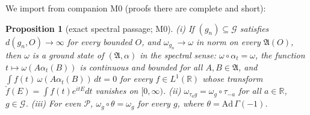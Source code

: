 \documentclass[11pt,a4paper]{article}
\theoremstyle{plain}
\newtheorem{proposition}[theorem]{Proposition}
\theoremstyle{definition}
\newcommand{\R}{\mathbb{R}}
\newcommand{\A}{\mathfrak{A}}
\newcommand{\G}{\mathcal{G}}
\begin{document}
We import from companion M0 (proofs there are complete and short):

\begin{proposition}[exact spectral passage; M0]\label{prop:M0-main}
\emph{(i)} If $(g_n)\subseteq\G$ satisfies $d(g_n,O)\to\infty$ for every bounded $O$, and
$\omega_{g_n}\to\omega$ in norm on every $\A(O)$, then $\omega$ is a ground state of
$(\A,\alpha)$ in the spectral sense: $\omega\circ\alpha_t=\omega$, the function
$t\mapsto\omega(A\alpha_t(B))$ is continuous and bounded for all $A,B\in\A$, and
$\int f(t)\,\omega(A\alpha_t(B))\,dt=0$ for every $f\in L^1(\R)$ whose transform
$\check f(E)=\int f(t)e^{itE}dt$ vanishes on $[0,\infty)$.
\emph{(ii)} $\omega_{\tau_ag}=\omega_g\circ\tau_{-a}$ for all $a\in\R$, $g\in\G$.
\emph{(iii)} For even $\mathscr P$, $\omega_g\circ\theta=\omega_g$ for every $g$, where
$\theta=\mathrm{Ad}\,\Gamma(-1)$.
\end{proposition}
\end{document}
